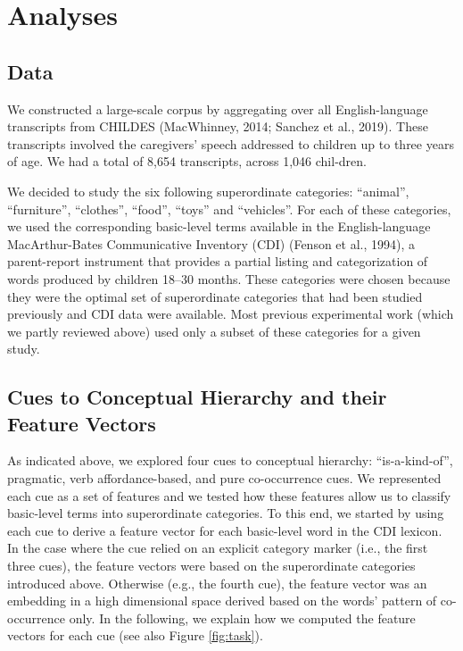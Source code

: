 \documentclass[english,,man,floatsintext]{apa6}
\begin{document}
\hypertarget{analyses}{%
\section{Analyses}\label{analyses}}

\hypertarget{data}{%
\subsection{Data}\label{data}}

We constructed a large-scale corpus by aggregating over all English-language transcripts from CHILDES (MacWhinney, 2014; Sanchez et al., 2019). These transcripts involved the caregivers' speech addressed to children up to three years of age. We had a total of 8,654 transcripts, across 1,046 chil-dren.

We decided to study the six following superordinate categories: \enquote{animal}, \enquote{furniture}, \enquote{clothes}, \enquote{food}, \enquote{toys} and \enquote{vehicles}. For each of these categories, we used the corresponding basic-level terms available in the English-language MacArthur-Bates Communicative Inventory (CDI) (Fenson et al., 1994), a parent-report instrument that provides a partial listing and categorization of words produced by children 18--30 months. These categories were chosen because they were the optimal set of
superordinate categories that had been studied previously and CDI data were available.
Most previous experimental work (which we partly reviewed above) used only a subset of these categories for a given study.

\hypertarget{cues-to-conceptual-hierarchy-and-their-feature-vectors}{%
\subsection{Cues to Conceptual Hierarchy and their Feature Vectors}\label{cues-to-conceptual-hierarchy-and-their-feature-vectors}}

As indicated above, we explored four cues to conceptual hierarchy: \enquote{is-a-kind-of}, pragmatic, verb affordance-based, and pure co-occurrence cues.
We represented each cue as a set of features and we tested how these features allow us to classify basic-level terms into superordinate
categories. To this end, we started by using each cue to derive a feature vector for each basic-level word in the CDI lexicon. In the case where the cue relied on an explicit category marker (i.e., the first three cues), the feature vectors were based on the superordinate categories introduced above. Otherwise (e.g., the fourth cue), the feature vector was an embedding in a high dimensional space derived based on the words' pattern of co-occurrence only. In the following, we explain how we computed the feature vectors for each cue (see also Figure \ref{fig:task}).
\end{document}
